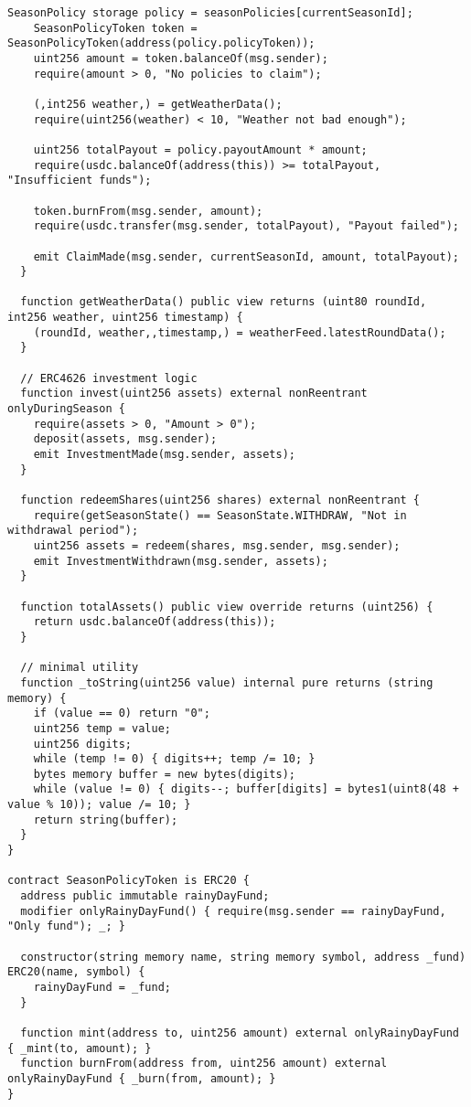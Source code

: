 \begin{lstlisting}[style=soliditystyle, caption={RainyDayFund.sol - Main Insurance Contract},label={lst:lstlisting}]
    SeasonPolicy storage policy = seasonPolicies[currentSeasonId];
    SeasonPolicyToken token = SeasonPolicyToken(address(policy.policyToken));
    uint256 amount = token.balanceOf(msg.sender);
    require(amount > 0, "No policies to claim");

    (,int256 weather,) = getWeatherData();
    require(uint256(weather) < 10, "Weather not bad enough");

    uint256 totalPayout = policy.payoutAmount * amount;
    require(usdc.balanceOf(address(this)) >= totalPayout, "Insufficient funds");

    token.burnFrom(msg.sender, amount);
    require(usdc.transfer(msg.sender, totalPayout), "Payout failed");

    emit ClaimMade(msg.sender, currentSeasonId, amount, totalPayout);
  }

  function getWeatherData() public view returns (uint80 roundId, int256 weather, uint256 timestamp) {
    (roundId, weather,,timestamp,) = weatherFeed.latestRoundData();
  }

  // ERC4626 investment logic
  function invest(uint256 assets) external nonReentrant onlyDuringSeason {
    require(assets > 0, "Amount > 0");
    deposit(assets, msg.sender);
    emit InvestmentMade(msg.sender, assets);
  }

  function redeemShares(uint256 shares) external nonReentrant {
    require(getSeasonState() == SeasonState.WITHDRAW, "Not in withdrawal period");
    uint256 assets = redeem(shares, msg.sender, msg.sender);
    emit InvestmentWithdrawn(msg.sender, assets);
  }

  function totalAssets() public view override returns (uint256) {
    return usdc.balanceOf(address(this));
  }

  // minimal utility
  function _toString(uint256 value) internal pure returns (string memory) {
    if (value == 0) return "0";
    uint256 temp = value;
    uint256 digits;
    while (temp != 0) { digits++; temp /= 10; }
    bytes memory buffer = new bytes(digits);
    while (value != 0) { digits--; buffer[digits] = bytes1(uint8(48 + value % 10)); value /= 10; }
    return string(buffer);
  }
}

contract SeasonPolicyToken is ERC20 {
  address public immutable rainyDayFund;
  modifier onlyRainyDayFund() { require(msg.sender == rainyDayFund, "Only fund"); _; }

  constructor(string memory name, string memory symbol, address _fund) ERC20(name, symbol) {
    rainyDayFund = _fund;
  }

  function mint(address to, uint256 amount) external onlyRainyDayFund { _mint(to, amount); }
  function burnFrom(address from, uint256 amount) external onlyRainyDayFund { _burn(from, amount); }
}
\end{lstlisting}


